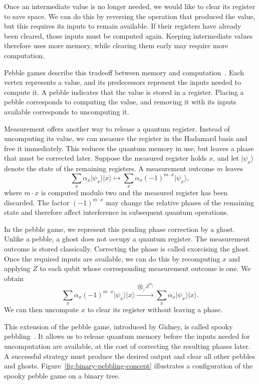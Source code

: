 \documentclass[11pt]{article}
\theoremstyle{definition}
\theoremstyle{remark}
\newcommand{\ket}[1]{\lvert#1\rangle}
\begin{document}
Once an intermediate value is no longer needed, we would like to clear its register to save space. We can do this by reversing the operation that produced the value, but this requires its inputs to remain available. If their registers have already been cleared, those inputs must be computed again. Keeping intermediate values therefore uses more memory, while clearing them early may require more computation.

Pebble games describe this tradeoff between memory and computation~\cite{Bennett1989}. Each vertex represents a value, and its predecessors represent the inputs needed to compute it. A pebble indicates that the value is stored in a register. Placing a pebble corresponds to computing the value, and removing it with its inputs available corresponds to uncomputing it.

Measurement offers another way to release a quantum register. Instead of uncomputing its value, we can measure the register in the Hadamard basis and free it immediately. This reduces the quantum memory in use, but leaves a phase that must be corrected later. Suppose the measured register holds $x$, and let $\ket{\psi_x}$ denote the state of the remaining registers. A measurement outcome $m$ leaves
\begin{equation}
    \sum_x \alpha_x\ket{\psi_x}\ket{x} \longmapsto \sum_x \alpha_x(-1)^{m\cdot x}\ket{\psi_x},
\end{equation}
where $m\cdot x$ is computed modulo two and the measured register has been discarded. The factor $(-1)^{m\cdot x}$ may change the relative phases of the remaining state and therefore affect interference in subsequent quantum operations.

In the pebble game, we represent this pending phase correction by a ghost. Unlike a pebble, a ghost does not occupy a quantum register. The measurement outcome is stored classically. Correcting the phase is called exorcising the ghost. Once the required inputs are available, we can do this by recomputing $x$ and applying $Z$ to each qubit whose corresponding measurement outcome is one. We obtain
\begin{equation}
    \sum_x \alpha_x(-1)^{m\cdot x}\ket{\psi_x}\ket{x} \xrightarrow{\bigotimes_j Z^{m_j}} \sum_x \alpha_x\ket{\psi_x}\ket{x}.
\end{equation}
We can then uncompute $x$ to clear its register without leaving a phase.

This extension of the pebble game, introduced by Gidney, is called spooky pebbling~\cite{Gidney2019}. It allows us to release quantum memory before the inputs needed for uncomputation are available, at the cost of correcting the resulting phases later. A successful strategy must produce the desired output and clear all other pebbles and ghosts. Figure~\ref{fig:binary-pebbling-concept} illustrates a configuration of the spooky pebble game on a binary tree.
\end{document}
